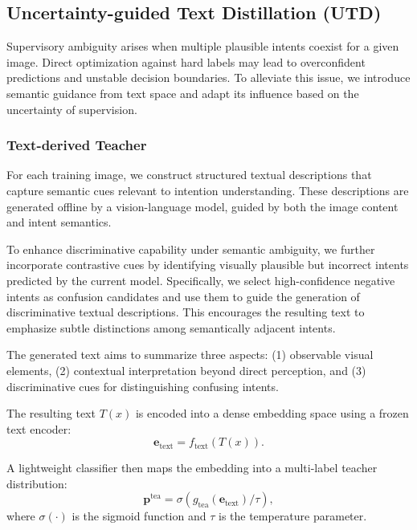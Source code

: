 \subsection{Uncertainty-guided Text Distillation (UTD)}


Supervisory ambiguity arises when multiple plausible intents coexist for a given image. Direct optimization against hard labels may lead to overconfident predictions and unstable decision boundaries. To alleviate this issue, we introduce semantic guidance from text space and adapt its influence based on the uncertainty of supervision.

\subsubsection{Text-derived Teacher}

For each training image, we construct structured textual descriptions that capture semantic cues relevant to intention understanding. These descriptions are generated offline by a vision-language model, guided by both the image content and intent semantics.

To enhance discriminative capability under semantic ambiguity, we further incorporate contrastive cues by identifying visually plausible but incorrect intents predicted by the current model. Specifically, we select high-confidence negative intents as confusion candidates and use them to guide the generation of discriminative textual descriptions. This encourages the resulting text to emphasize subtle distinctions among semantically adjacent intents.

The generated text aims to summarize three aspects:
(1) observable visual elements,
(2) contextual interpretation beyond direct perception, and
(3) discriminative cues for distinguishing confusing intents.

The resulting text $T(x)$ is encoded into a dense embedding space using a frozen text encoder:
\begin{equation}
\mathbf{e}_{\text{text}} = f_{\text{text}}(T(x)).
\end{equation}

A lightweight classifier then maps the embedding into a multi-label teacher distribution:
\begin{equation}
\mathbf{p}^{\text{tea}} = \sigma(g_{\text{tea}}(\mathbf{e}_{\text{text}}) / \tau),
\end{equation}
where $\sigma(\cdot)$ is the sigmoid function and $\tau$ is the temperature parameter.

